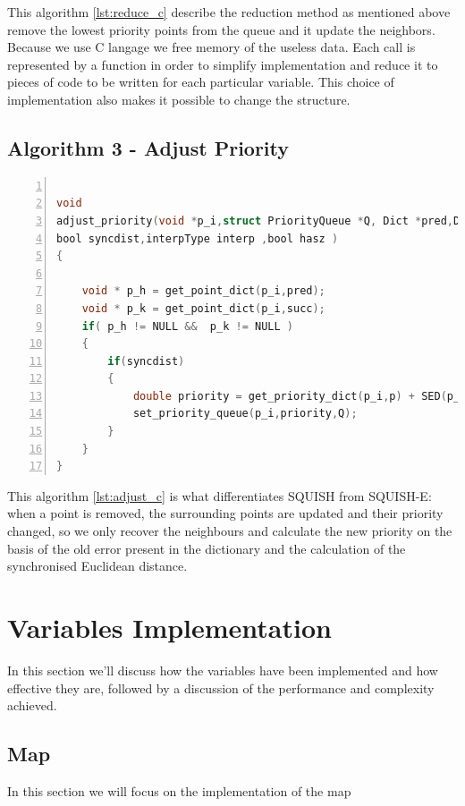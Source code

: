This algorithm \ref{lst:reduce_c} describe the reduction method as mentioned above remove the lowest priority points from the queue and it update the neighbors. Because we use C langage we free memory of the useless data. Each call is represented by a function in order to simplify implementation and reduce it to pieces of code to be written for each particular variable. This choice of implementation also makes it possible to change the structure. 

\subsection{Algorithm 3 - Adjust Priority} 

\begin{lstlisting}[language=C, % Spécifie le langage du code
caption={adjust\_priority}, % Légende du listing
label=lst:adjust_c, % Étiquette pour référencer le listing
numbers=left,
numberstyle=\tiny\color{gray},
stepnumber=1,
frame=single,
breaklines=true,
postbreak=\mbox{\textcolor{red}{$\hookrightarrow$}\space},
showstringspaces=false,
float,
floatplacement=H
]

void
adjust_priority(void *p_i,struct PriorityQueue *Q, Dict *pred,Dict *succ,PDict  *p,
bool syncdist,interpType interp ,bool hasz )
{

	void * p_h = get_point_dict(p_i,pred);
	void * p_k = get_point_dict(p_i,succ);
	if( p_h != NULL &&  p_k != NULL )
	{
		if(syncdist)
		{
			double priority = get_priority_dict(p_i,p) + SED(p_h,p_i,p_k, interp , hasz );
			set_priority_queue(p_i,priority,Q);
		}
	}
}

\end{lstlisting}
 

This algorithm \ref{lst:adjust_c} is what differentiates SQUISH from SQUISH-E: when a point is removed, the surrounding points are updated and their priority changed, so we only recover the neighbours and calculate the new priority on the basis of the old error present in the dictionary and the calculation of the synchronised Euclidean distance. 


\section{Variables Implementation}
In this section we'll discuss how the variables have been implemented and how effective they are, followed by a discussion of the performance and complexity achieved.

\subsection{Map}
In this section we will focus on the implementation of the map

